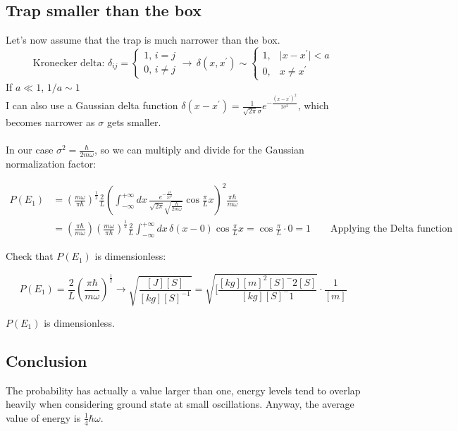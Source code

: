 	\subsection{Trap smaller than the box}
	Let's now assume that the trap is much narrower than the box.
	\[\text{Kronecker delta: }  \delta_{i j}=\begin{cases}1,\, i=j \\ 0,\, i \neq j \end{cases} \rightarrow\, \delta(x, x^{\prime}) \sim\begin{cases}1,& \mid x-x^{\prime} \mid<a \\ 0, & x \neq x^{\prime}\end{cases}
	\]
	If $a\ll1$, $1/a\sim 1$\\
	I can also use a Gaussian delta function  $\delta\left(x-x^{\prime}\right)=\frac{1}{\sqrt{2 \pi} \sigma} e^{-\frac{\left(x-x^{\prime}\right)^{2}}{2 \sigma^{2}}}$, which becomes narrower as $\sigma$ gets smaller.\\
	\\
	In our case $\sigma^2= \frac{\hbar}{2m\omega}$, so we can multiply and divide for the Gaussian normalization factor:

	\begin{align*}
		P\left(E_{1}\right)&=\left(\frac{m \omega}{ \pi \hbar}\right)^{\frac{1}{2}} \frac{2}{L}\left(\int_{-\infty}^{+\infty} d x\, \frac{e^{-\frac{x^{2}}{2\sigma^2}}}{\sqrt{2 \pi} \sqrt{\frac{\hbar}{2 m \omega}}} \cos \frac{\pi}{L} x\right)^2 \frac{ \pi \hbar}{m \omega}\\
											 &=\left(\frac{ \pi \hbar}{m\omega}\right) \left(\frac{m \omega}{ \pi \hbar}\right)^{\frac{1}{2}} \frac{2}{L}\int_{-\infty}^{+\infty} d x\, \delta(x-0) \cos \frac{\pi}{L} x=\cos \frac{\pi}{L} \cdot0=1\qquad\text{Applying the Delta function}
	\end{align*}

	\noindent
	Check that $P(E_1)$ is dimensionless:

	$$P\left(E_{1}\right)=\frac{2}{L}\left(\frac{ \pi \hbar}{m \omega}\right)^{\frac{1}{2}} \rightarrow \sqrt{\frac{[J][S]}{[k g][S]^{-1}}}=\sqrt{[\frac{[kg][m]^2[S]^-2[S]}{[kg][S]^-1}} \cdot \frac{1}{[m]}$$

	$P\left(E_{1}\right)$ is dimensionless.

	\subsection{Conclusion}
	The probability has actually a value larger than one, energy levels tend to overlap heavily when considering ground state at small oscillations.
	Anyway, the average value of energy is $\frac{1}{4}\hbar\omega$.
